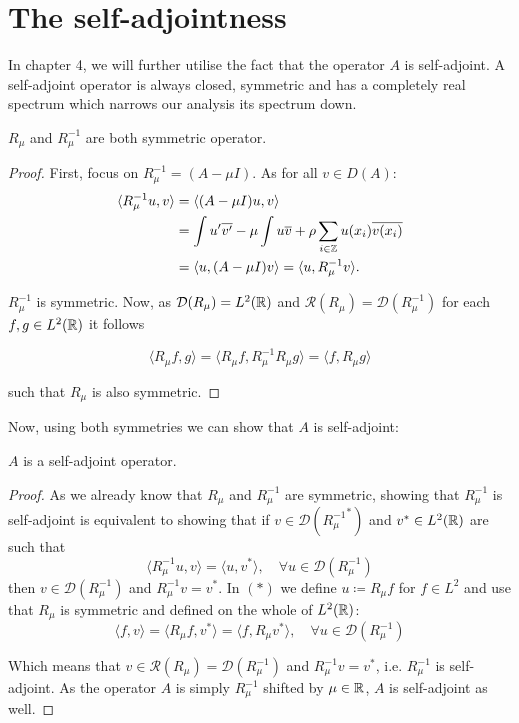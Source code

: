 \section{The self-adjointness}

In chapter 4, we will further utilise the fact that the operator $A$ is self-adjoint. A self-adjoint operator is always closed, symmetric and has a completely real spectrum which narrows our analysis its spectrum down. 

\begin{theorem} \label{2.2:thm-RmuSymmetric}
	$R_{\mu}$ and $R_{\mu}^{-1}$ are both symmetric operator.
	
	\begin{proof}
		First, focus on $R_{\mu}^{-1} = (A - \mu I)$. As for all $v \in D(A)$:
			\begin{align*}
				\langle R_{\mu}^{-1} u, v \rangle & = \langle (A - \mu I) u, v \rangle \\
					& = \int u'\overline{v'} -  \mu \int u \overline{v} + \rho \sum_{i \in \mathbb{Z}} u(x_{i}) \overline{v(x_{i})} \\
					& = \langle u, (A - \mu I) v \rangle = \langle u,  R_{\mu}^{-1} v \rangle.
			\end{align*}

		$R_{\mu}^{-1}$ is symmetric. Now, as $\mathcal{D}(R_{\mu}) = L^{2}(\mathbb{R})$ and $\mathcal{R}(R_{\mu}) = \mathcal{D}(R_{\mu}^{-1})$ for each $f, g \in L^{2}(\mathbb{R})$ it follows
		
		\[  \langle R_{\mu} f, g \rangle =  \langle R_{\mu} f, R_{\mu}^{-1} R_{\mu} g \rangle = \langle f, R_{\mu} g \rangle \]
		
		such that $R_{\mu}$ is also symmetric.
	\end{proof}
\end{theorem}

Now, using both symmetries we can show that $A$ is self-adjoint:

\begin{theorem} \label{2.3:thm-ASelfAdjoint}
	$A$ is a self-adjoint operator. %
		
	\begin{proof}
		As we already know that $R_{\mu}$ and $R_{\mu}^{-1}$ are symmetric, showing that $R_{\mu}^{-1}$ is self-adjoint is equivalent to showing that if $v \in \mathcal{D}({R_{\mu}^{-1}}^{*})$ and $v^{*} \in L^{2}(\mathbb{R})$ are such that
		\[ \langle R_{\mu}^{-1} u, v \rangle = \langle u, v^{*} \rangle, \quad \forall u \in \mathcal{D}(R_{\mu}^{-1}) \tag*{(*)} \]
		then $v \in \mathcal{D}(R_{\mu}^{-1})$ and $R_{\mu}^{-1} v = v^{*}$.
		In $(*)$ we define $u \coloneqq R_{\mu} f$ for $f \in L^{2}$ and use that $R_{\mu}$ is symmetric and defined on the whole of $L^{2}(\mathbb{R})$:
		\[  \langle f, v \rangle = \langle R_{\mu} f, v^{*} \rangle = \langle f, R_{\mu} v^{*} \rangle, \quad \forall u \in \mathcal{D}(R_{\mu}^{-1}) \]
		
		Which means that $v \in \mathcal{R}(R_{\mu}) = \mathcal{D}(R_{\mu}^{-1})$ and $R_{\mu}^{-1} v = v^{*}$, i.e. $R_{\mu}^{-1}$ is self-adjoint. As the operator $A$ is simply $R_{\mu}^{-1}$ shifted by $\mu \in \mathbb{R}$, $A$ is self-adjoint as well.		
	\end{proof}
\end{theorem}